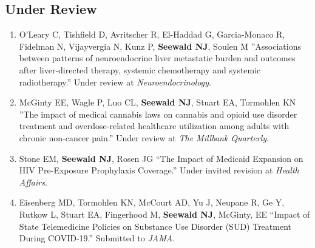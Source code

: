 \documentclass[letterpaper,11pt]{article} %
\begin{document}
    \subsection*{Under Review}
        \begin{enumerate}  
            \item O'Leary C, Tishfield D, Avritscher R, El-Haddad G, Garcia-Monaco R, Fidelman N, Vijayvergia N, Kunz P, \textbf{Seewald NJ}, Soulen M ''Associations between patterns of neuroendocrine liver metastatic burden and outcomes after liver-directed therapy, systemic chemotherapy and systemic radiotherapy.'' Under review at \textit{Neuroendocrinology}.
            
            \item McGinty EE, Wagle P, Luo CL, \textbf{Seewald NJ}, Stuart EA, Tormohlen KN ''The impact of medical cannabis laws on cannabis and opioid use disorder treatment and overdose-related healthcare utilization among adults with chronic non-cancer pain.'' Under review at \textit{The Millbank Quarterly}.
        
            \item Stone EM, \textbf{Seewald NJ}, Rosen JG ``The Impact of Medicaid Expansion on HIV Pre-Exposure Prophylaxis Coverage.'' Under invited revision at \textit{Health Affairs}.
            
            \item Eisenberg MD, Tormohlen KN, McCourt AD, Yu J, Neupane R, Ge Y, Rutkow L, Stuart EA, Fingerhood M, \textbf{Seewald NJ}, McGinty, EE ``Impact of State Telemedicine Policies on Substance Use Disorder (SUD) Treatment During COVID-19.'' Submitted to \textit{JAMA}.
	    \end{enumerate}
	
\end{document}
